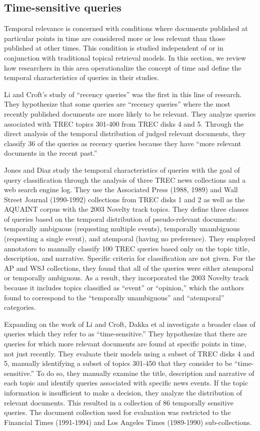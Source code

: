 \documentclass[runningheads,a4paper]{llncs}
\begin{document}
\subsection{Time-sensitive queries}
Temporal relevance is concerned with conditions where documents published at particular points in time are considered more or less relevant than those published at other times. This condition is studied independent of or in conjunction with traditional topical retrieval models. In this section, we review how researchers in this area operationalize the concept of time and define the temporal characteristics of queries in their studies. 

Li and Croft's study of ``recency queries''  \cite{Li2003} was the first in this line of research. They hypothesize that some queries are ``recency queries'' where the most recently published documents are more likely to be relevant. They analyze queries associated with TREC topics 301-400 from TREC disks 4 and 5. Through the direct analysis of the temporal distribution of judged relevant documents, they classify 36 of the queries as recency queries because they have ``more relevant documents in the recent past.''

Jones and Diaz \cite{Jones2007} study the temporal characteristics of queries with the goal of query classification through the analysis of three TREC news collections and a web search engine log. They use the Associated Press (1988, 1989) and Wall Street Journal (1990-1992) collections from TREC disks 1 and 2 as well as the AQUAINT corpus with the 2003 Novelty track topics. They define three classes of queries based on the temporal distribution of pseudo-relevant documents: temporally ambiguous (requesting multiple events),  temporally unambiguous (requesting a single event), and atemporal (having no preference). They employed annotators to  manually classify 100 TREC queries based only on the topic title, description, and narrative. Specific criteria for classification are not given. For the AP and WSJ collections, they found that all of the queries were either atemporal or temporally ambiguous. As a result, they incorporated the 2003 Novelty track because it includes topics classified as ``event'' or ``opinion,'' which the authors found to correspond to the ``temporally unambiguous'' and ``atemporal'' categories. 

Expanding on the work of Li and Croft, Dakka et al \cite{Dakka2012} investigate a broader class of queries which they refer to as ``time-sensitive.'' They hypothesize that there are queries for which more relevant documents are found at specific points in time, not just recently. They evaluate their models using a subset of TREC disks 4 and 5, manually identifying a subset of topics 301-450 that they consider to be ``time-sensitive.'' To do so, they manually examine the title, description and narrative of each topic and identify queries associated with specific news events. If the topic information is insufficient to make a decision, they analyze the distribution of relevant documents. This resulted in a collection of 86 temporally sensitive queries. The document collection used for evaluation was restricted to the Financial Times (1991-1994) and Los Angeles Times (1989-1990) sub-collections.
\end{document}
